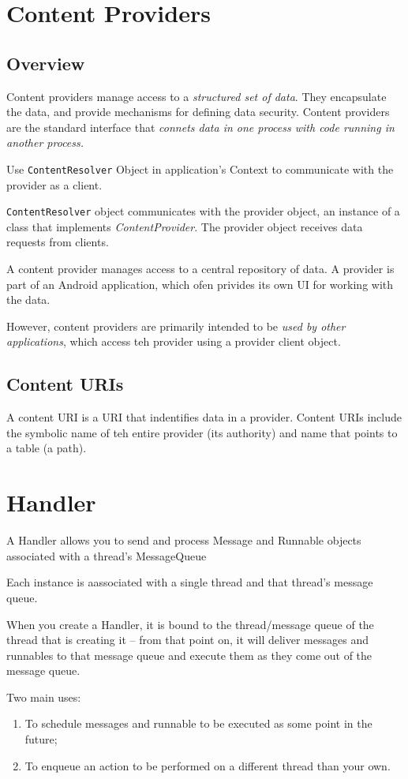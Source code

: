 \documentclass[11pt, a4paper]{book}
\begin{document}
\section{Content Providers}
\subsection{Overview}
Content providers manage access to a \emph{structured set of data}. They
encapsulate the data, and provide mechanisms for defining data security. Content
providers are the standard interface that \emph{connets data in one process with
code running in another process.}

Use \verb|ContentResolver| Object in application's Context to communicate with
the provider as a client. 

\verb|ContentResolver| object communicates with the provider object, an instance
of a class that implements \emph{ContentProvider}. The provider object receives
data requests from clients. 

A content provider manages access to a central repository of data. A provider is
part of an Android application, which ofen privides its own UI for working with
the data. 

However, content providers are primarily intended to be \emph{used by other
applications}, which access teh provider using a provider client object. 

\subsection{Content URIs}
A content URI is a URI that indentifies data in a provider. Content URIs include
the symbolic name of teh entire provider (its authority) and name that points to
a table (a path).
\section{Handler}
A Handler allows you to send and process Message and Runnable objects associated
with a thread's MessageQueue

Each instance is aassociated with a single thread and that thread's message
queue.

When you create a Handler, it is bound to the thread/message queue of the thread
that is creating it -- from that point on, it will deliver messages and
runnables to that message queue and execute them as they come out of the message
queue. 

Two main uses:
\begin{enumerate}
\item To schedule messages and runnable to be executed as some point in the
future;
\item To enqueue an action to be performed on a different thread than your own.
\end{enumerate}
\end{document}
